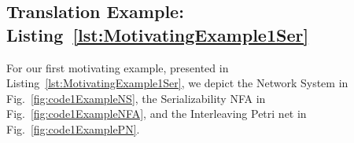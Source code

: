 \subsection{Translation Example: Listing~\ref{lst:MotivatingExample1Ser}}
\label{appendix:subsec::Ex1A:NS}


For our first motivating example, presented in Listing~\ref{lst:MotivatingExample1Ser}, we depict the Network System in Fig.~\ref{fig:code1ExampleNS}, the Serializability NFA in Fig.~\ref{fig:code1ExampleNFA}, and the Interleaving Petri net in Fig.~\ref{fig:code1ExamplePN}.



